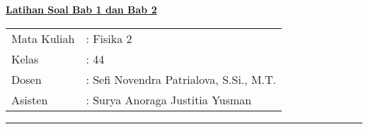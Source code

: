 \documentclass[12pt,a4paper]{article}
\begin{document}
\begin{center}
    \underline{\large \textbf{Latihan Soal Bab 1 dan Bab 2}}
\end{center}
\begin{tabular}{l l}
    Mata Kuliah & : Fisika 2 \\
    Kelas & : 44 \\
    Dosen & : Sefi Novendra Patrialova, S.Si., M.T. \\
    Asisten & : Surya Anoraga Justitia Yusman
\end{tabular}
\vskip10pt
\hrule 
\vskip 20pt



%




\end{document}
